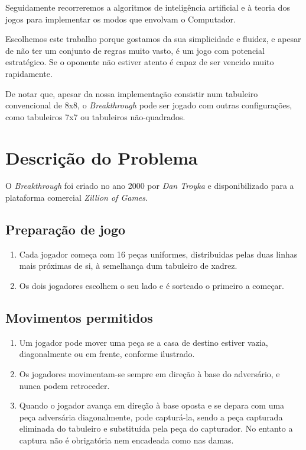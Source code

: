 \documentclass[15pt,a4paper]{article}
\begin{document}
Seguidamente recorreremos a algoritmos de inteligência artificial e à teoria dos jogos para implementar os modos que envolvam o Computador.


Escolhemos este trabalho porque gostamos da sua simplicidade e fluidez, e apesar de não ter um conjunto de regras muito vasto, é um jogo com potencial estratégico. 
Se o oponente não estiver atento é capaz de ser vencido muito rapidamente.

De notar que, apesar da nossa implementação consistir num tabuleiro convencional de 8x8, o \textit{Breakthrough} pode ser jogado com outras configurações, como tabuleiros 7x7 ou tabuleiros não-quadrados.


\section{Descrição do Problema}


O \textit{Breakthrough} foi criado no ano 2000 por \textit{Dan Troyka}  e disponibilizado para a plataforma comercial \textit{Zillion of Games}. 

\subsection{Preparação de jogo}
\begin{enumerate}
\item Cada jogador começa com 16 peças uniformes, distribuidas pelas duas linhas mais próximas de si, à semelhança dum tabuleiro de xadrez.
\item Os dois jogadores escolhem o seu lado e é sorteado o primeiro a começar.
\end{enumerate}

\subsection{Movimentos permitidos}
\begin{enumerate}
\item Um jogador pode mover uma peça se a casa de destino estiver vazia, diagonalmente ou em frente, conforme ilustrado.
\item Os jogadores movimentam-se sempre em direção à base do adversário, e nunca podem retroceder.
\item Quando o jogador avança em direção à base oposta e se depara com uma peça adversária diagonalmente, pode capturá-la, sendo a peça capturada eliminada do tabuleiro e substituída pela peça do capturador. 
No entanto a captura não é obrigatória nem encadeada como nas damas.
\end{enumerate}
\end{document}
